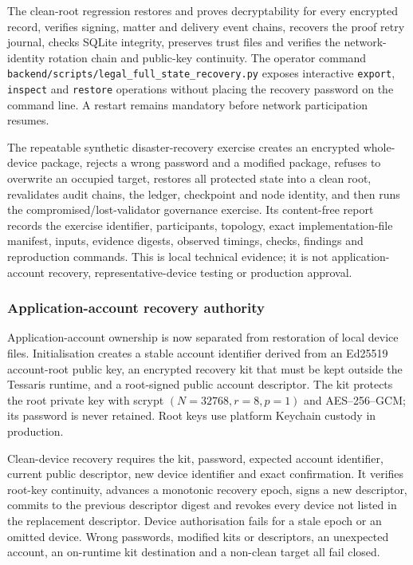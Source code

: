 The clean-root regression restores and proves decryptability for every encrypted
record, verifies signing, matter and delivery event chains, recovers the proof
retry journal, checks SQLite integrity, preserves trust files and verifies the
network-identity rotation chain and public-key continuity. The operator command
\texttt{backend/scripts/legal\_full\_state\_recovery.py} exposes interactive
\texttt{export}, \texttt{inspect} and \texttt{restore} operations without
placing the recovery password on the command line. A restart remains mandatory
before network participation resumes.

The repeatable synthetic disaster-recovery exercise creates an encrypted
whole-device package, rejects a wrong password and a modified package, refuses
to overwrite an occupied target, restores all protected state into a clean
root, revalidates audit chains, the ledger, checkpoint and node identity, and
then runs the compromised/lost-validator governance exercise.  Its content-free
report records the exercise identifier, participants, topology, exact
implementation-file manifest, inputs, evidence digests, observed timings,
checks, findings and reproduction commands.  This is local technical evidence;
it is not application-account recovery, representative-device testing or
production approval.

\subsubsection{Application-account recovery authority}

Application-account ownership is now separated from restoration of local
device files.  Initialisation creates a stable account identifier derived from
an Ed25519 account-root public key, an encrypted recovery kit that must be kept
outside the Tessaris runtime, and a root-signed public account descriptor.  The
kit protects the root private key with scrypt
\((N=32768,r=8,p=1)\) and AES--256--GCM; its password is never retained.  Root
keys use platform Keychain custody in production.

Clean-device recovery requires the kit, password, expected account identifier,
current public descriptor, new device identifier and exact confirmation.  It
verifies root-key continuity, advances a monotonic recovery epoch, signs a new
descriptor, commits to the previous descriptor digest and revokes every device
not listed in the replacement descriptor.  Device authorisation fails for a
stale epoch or an omitted device.  Wrong passwords, modified kits or
descriptors, an unexpected account, an on-runtime kit destination and a
non-clean target all fail closed.

